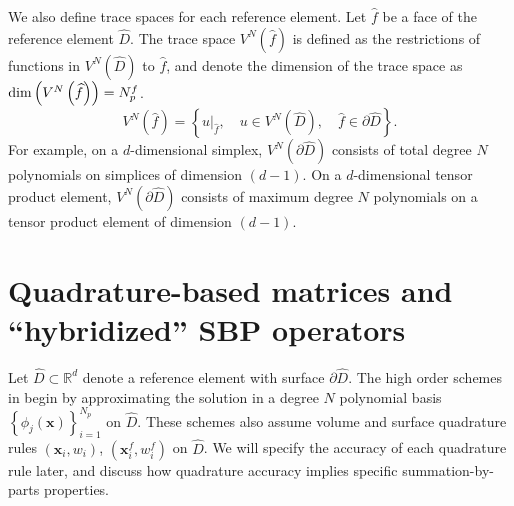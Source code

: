\documentclass{svjour3}                     %
\renewcommand{\hat}{\widehat}
\newcommand{\LRp}[1]{\left( #1 \right)}
\newcommand{\LRc}[1]{\left\{ #1 \right\}}
\renewcommand{\note}[1]{{\color{blue}{#1}}}
\begin{document}
We also define trace spaces for each reference element.  Let $\hat{f}$ be a face of the reference element $\hat{D}$.  The trace space $V^N \LRp{\hat{f}}$ is defined as the restrictions of functions in $V^N\LRp{\hat{D}}$ to $\hat{f}$, and denote the dimension of the trace space as ${\rm dim}\LRp{V^N\LRp{{\hat{f}}}} = N^f_p$.  
\[
V^N \LRp{\hat{f}} = \LRc{ \left.u\right|_{\hat{f}}, \quad u \in V^N\LRp{\hat{D}}, \quad \hat{f}\in \partial\hat{D}}.
\]
For example, on a $d$-dimensional simplex, $V^N \LRp{\partial \hat{D}}$ consists of total degree $N$ polynomials on simplices of dimension $(d-1)$.  On a $d$-dimensional tensor product element, $V^N \LRp{\partial \hat{D}}$ consists of maximum degree $N$ polynomials on a tensor product element of dimension $(d-1)$.  




\section{Quadrature-based matrices and ``hybridized'' SBP operators}
\label{sec:sbp}
Let $\hat{D} \subset\mathbb{R}^d$ denote a reference element with surface $\partial \hat{D}$.  
The high order schemes in \cite{chan2017discretely, chan2018discretely} begin by approximating the solution in a degree $N$ polynomial basis $\LRc{\phi_j({\bm{x}})}_{i=1}^{N_p}$ on $\hat{D}$.  These schemes also assume volume and surface quadrature rules $({\bm{x}}_i, w_i)$, $\LRp{{\bm{x}}^f_i,w^f_i}$ on $\hat{D}$.  We will specify the accuracy of each quadrature rule later, and discuss how quadrature accuracy implies specific summation-by-parts properties.  
\end{document}
